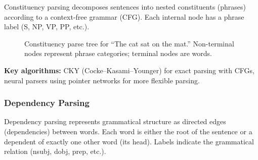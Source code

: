 Constituency parsing decomposes sentences into nested constituents (phrases) according to a
context-free grammar (CFG). Each internal node has a phrase label (S, NP, VP, PP, etc.).

\begin{figure}[H]
\centering
{}
\caption{Constituency parse tree for ``The cat sat on the mat.'' Non-terminal nodes
represent phrase categories; terminal nodes are words.}
\label{fig:constituency_parse}
\end{figure}

\textbf{Key algorithms:} CKY (Cocke--Kasami--Younger) for exact parsing with CFGs,
neural parsers using pointer networks for more flexible parsing.

\subsubsection{Dependency Parsing}

Dependency parsing represents grammatical structure as directed edges (dependencies)
between words. Each word is either the root of the sentence or a dependent of exactly
one other word (its head). Labels indicate the grammatical relation (nsubj, dobj, prep,
etc.).

